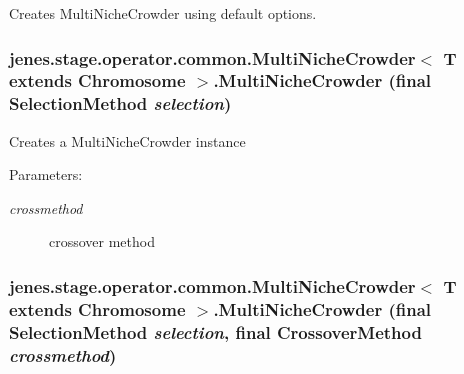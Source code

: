 Creates MultiNicheCrowder using default options. \hypertarget{classjenes_1_1stage_1_1operator_1_1common_1_1_multi_niche_crowder_3_01_t_01extends_01_chromosome_01_4_45d8181936a9298ecc7edcfee8647590}{
\subsubsection[MultiNicheCrowder]{\setlength{\rightskip}{0pt plus 5cm}jenes.stage.operator.common.MultiNicheCrowder$<$ T extends Chromosome $>$.MultiNicheCrowder (final {\bf SelectionMethod} {\em selection})}}
\label{classjenes_1_1stage_1_1operator_1_1common_1_1_multi_niche_crowder_3_01_t_01extends_01_chromosome_01_4_45d8181936a9298ecc7edcfee8647590}


Creates a MultiNicheCrowder instance

\begin{Desc}
\item[Parameters:]
\begin{description}
\item[{\em crossmethod}]crossover method \end{description}
\end{Desc}
\hypertarget{classjenes_1_1stage_1_1operator_1_1common_1_1_multi_niche_crowder_3_01_t_01extends_01_chromosome_01_4_5f539242ac756ac79df20945afc5e425}{
\subsubsection[MultiNicheCrowder]{\setlength{\rightskip}{0pt plus 5cm}jenes.stage.operator.common.MultiNicheCrowder$<$ T extends Chromosome $>$.MultiNicheCrowder (final {\bf SelectionMethod} {\em selection}, \/  final {\bf CrossoverMethod} {\em crossmethod})}}
\label{classjenes_1_1stage_1_1operator_1_1common_1_1_multi_niche_crowder_3_01_t_01extends_01_chromosome_01_4_5f539242ac756ac79df20945afc5e425}


